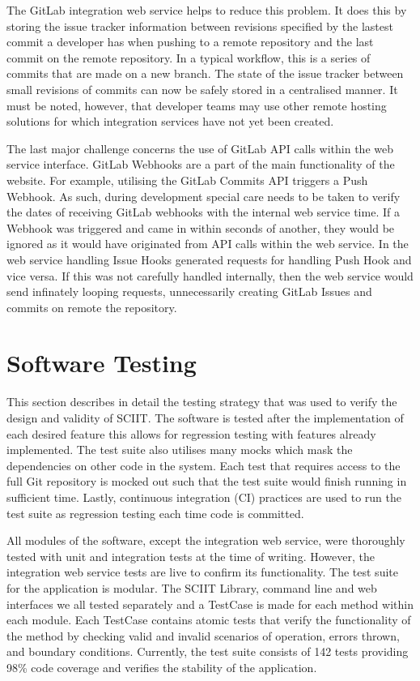 \documentclass{mproj}
\begin{document}
The GitLab integration web service helps to reduce this problem. It does this by storing the issue tracker information between revisions specified by the lastest commit a developer has when pushing to a remote repository and the last commit on the remote repository. In a typical workflow, this is a series of commits that are made on a new branch. The state of the issue tracker between small revisions of commits can now be safely stored in a centralised manner. It must be noted, however, that developer teams may use other remote hosting solutions for which integration services have not yet been created.

The last major challenge concerns the use of GitLab API calls within the web service interface. GitLab Webhooks are a part of the main functionality of the website. For example, utilising the GitLab Commits API triggers a Push Webhook. As such, during development special care needs to be taken to verify the dates of receiving GitLab webhooks with the internal web service time. If a Webhook was triggered and came in within seconds of another, they would be ignored as it would have originated from API calls within the web service. In the web service handling Issue Hooks generated requests for handling Push Hook and vice versa. If this was not carefully handled internally, then the web service would send infinately looping requests, unnecessarily creating GitLab Issues and commits on remote the repository.

\section{Software Testing} %

This section describes in detail the testing strategy that was used to verify the design and validity of SCIIT. The software is tested after the implementation of each desired feature this allows for regression testing with features already implemented. The test suite also utilises many mocks which mask the dependencies on other code in the system. Each test that requires access to the full Git repository is mocked out such that the test suite would finish running in sufficient time. Lastly, continuous integration (CI) practices are used to run the test suite as regression testing each time code is committed.

All modules of the software, except the integration web service, were thoroughly tested with unit and integration tests at the time of writing. However, the integration web service tests are live to confirm its functionality. The test suite for the application is modular. The SCIIT Library, command line and web interfaces we all tested separately and a TestCase is made for each method within each module. Each TestCase contains atomic tests that verify the functionality of the method by checking valid and invalid scenarios of operation, errors thrown, and boundary conditions. Currently, the test suite consists of 142 tests providing 98\% code coverage and verifies the stability of the application.
\end{document}
